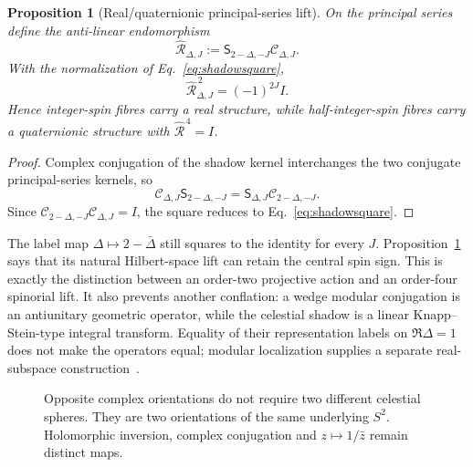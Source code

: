 \documentclass[11pt]{article}
\newtheorem{proposition}[theorem]{Proposition}
\theoremstyle{definition}\newtheorem{definition}[theorem]{Definition}
\theoremstyle{remark}\newtheorem{remark}[theorem]{Remark}\newtheorem{conjecture}[theorem]{Conjecture}
\begin{document}
\begin{proposition}[Real/quaternionic principal-series lift]\label{prop:celestialquat}
On the principal series define the anti-linear endomorphism
\begin{equation}
 \widehat{\mathcal R}_{\Delta,J}
 :=\mathsf S_{2-\Delta,-J}\mathcal C_{\Delta,J}.
\end{equation}
With the normalization of Eq.~\eqref{eq:shadowsquare},
\begin{equation}
 \boxed{\widehat{\mathcal R}_{\Delta,J}^{\,2}=(-1)^{2J}I.}
\end{equation}
Hence integer-spin fibres carry a real structure, while half-integer-spin fibres carry a quaternionic structure with $\widehat{\mathcal R}^{\,4}=I$.
\end{proposition}

\begin{proof}
Complex conjugation of the shadow kernel interchanges the two conjugate principal-series kernels, so
\begin{equation}
 \mathcal C_{\Delta,J}\mathsf S_{2-\Delta,-J}
 =\mathsf S_{\Delta,J}\mathcal C_{2-\Delta,-J}.
\end{equation}
Since $\mathcal C_{2-\Delta,-J}\mathcal C_{\Delta,J}=I$, the square reduces to Eq.~\eqref{eq:shadowsquare}.
\end{proof}

The label map $\Delta\mapsto2-\bar\Delta$ still squares to the identity for every $J$. Proposition~\ref{prop:celestialquat} says that its natural Hilbert-space lift can retain the central spin sign. This is exactly the distinction between an order-two projective action and an order-four spinorial lift. It also prevents another conflation: a wedge modular conjugation is an antiunitary geometric operator, while the celestial shadow is a linear Knapp--Stein-type integral transform. Equality of their representation labels on $\Re\Delta=1$ does not make the operators equal; modular localization supplies a separate real-subspace construction~\cite{BGL2002}.

\begin{figure}[t]
\centering
{}
\caption{Opposite complex orientations do not require two different celestial spheres. They are two orientations of the same underlying $S^2$. Holomorphic inversion, complex conjugation and $z\mapsto1/\bar z$ remain distinct maps.}
\label{fig:sphere}
\end{figure}
\end{document}
